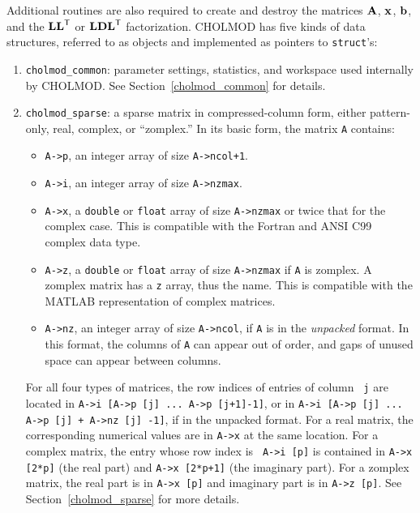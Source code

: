 \documentclass[11pt]{article}
\newcommand{\m}[1]{{\bf{#1}}}       %
\newcommand{\tr}{^{\sf T}}          %
\begin{document}
Additional routines are also required to create and destroy the matrices
$\m{A}$, $\m{x}$, $\m{b}$, and the $\m{LL}\tr$ or $\m{LDL}\tr$ factorization.
CHOLMOD has five kinds of data structures, referred to as objects and
implemented as pointers to {\tt struct}'s:

\begin{enumerate}
\item {\tt cholmod\_common}:  parameter settings, statistics, and workspace
    used internally by CHOLMOD.  See Section~\ref{cholmod_common} for details.

\item {\tt cholmod\_sparse}:  a sparse matrix in compressed-column form,
    either pattern-only, real, complex, or ``zomplex.''  In its basic form,
    the matrix {\tt A} contains:
    \begin{itemize}
        \item {\tt A->p}, an integer array of size {\tt A->ncol+1}.
        \item {\tt A->i}, an integer array of size {\tt A->nzmax}.
        \item {\tt A->x}, a {\tt double} or {\tt float}
            array of size {\tt A->nzmax} or twice that for the complex case.
            This is compatible with the Fortran and ANSI C99 complex data type.
        \item {\tt A->z}, a {\tt double} or {\tt float}
            array of size {\tt A->nzmax} if {\tt A} is zomplex.  A zomplex
            matrix has a {\tt z} array, thus the name.  This is compatible with
            the MATLAB representation of complex matrices.
        \item {\tt A->nz}, an integer array of size {\tt A->ncol}, if
            {\tt A} is in the {\em unpacked} format.  In this format,
            the columns of {\tt A} can appear out of order, and gaps of
            unused space can appear between columns.
    \end{itemize}

    For all four types of matrices, the row indices of entries of column {\tt
    j} are located in {\tt A->i [A->p [j] ... A->p [j+1]-1]}, or in {\tt A->i
    [A->p [j] ... A->p [j] + A->nz [j] -1]}, if in the unpacked format.  For a
    real matrix, the corresponding numerical values are in {\tt A->x} at the
    same location.  For a complex matrix, the entry whose row index is {\tt
    A->i [p]} is contained in {\tt A->x [2*p]} (the real part) and {\tt A->x
    [2*p+1]} (the imaginary part).  For a zomplex matrix, the real part is in
    {\tt A->x [p]} and imaginary part is in {\tt A->z [p]}.  See
    Section~\ref{cholmod_sparse} for more details.


\end{enumerate}
\end{document}
